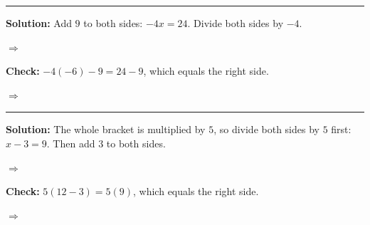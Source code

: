 \documentclass[12pt]{article}
\begin{document}
\vspace{0.15cm}\noindent\rule{\linewidth}{0.2pt}


\textbf{Solution:} Add $9$ to both sides: $-4x = 24$. Divide both sides by $-4$.

$\Rightarrow$ 

\textbf{Check:} $-4(-6) - 9 = 24 - 9$, which equals the right side.

$\Rightarrow$ 

\vspace{0.15cm}\noindent\rule{\linewidth}{0.2pt}


\textbf{Solution:} The whole bracket is multiplied by $5$, so divide both sides by $5$ first: $x - 3 = 9$. Then add $3$ to both sides.

$\Rightarrow$ 

\textbf{Check:} $5(12 - 3) = 5(9)$, which equals the right side.

$\Rightarrow$ 
\end{document}
